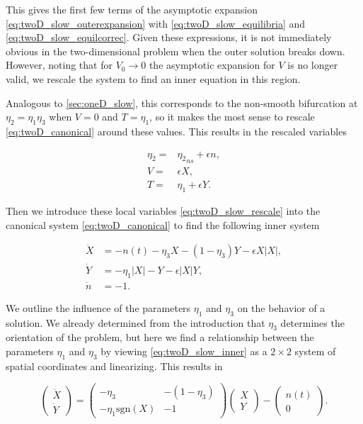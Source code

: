 This gives the first few terms of the asymptotic expansion \eqref{eq:twoD_slow_outerexpansion} with \eqref{eq:twoD_slow_equilibria} and \eqref{eq:twoD_slow_equilcorrec}. Given these expressions, it is not immediately obvious in the two-dimensional problem when the outer solution breaks down. However, noting that for $V_0\to 0$ the asymptotic expansion for $V$ is no longer valid, we rescale the system to find an inner equation in this region. 

Analogous to \autoref{sec:oneD_slow}, this corresponds to the non-smooth bifurcation at $\eta_2=\eta_1\eta_3$ when $V=0$ and $T=\eta_1$, so it makes the most sense to rescale \eqref{eq:twoD_canonical} around these values. This results in the rescaled variables

\begin{equation}\label{eq:twoD_slow_rescale}
\begin{aligned}
\eta_2=&{\eta_2}_{ns}+\epsilon n,\\
V=&\epsilon X,\\
T=&\eta_1+\epsilon Y.
\end{aligned}
\end{equation}

Then we introduce these local variables \eqref{eq:twoD_slow_rescale} into the canonical system \eqref{eq:twoD_canonical} to find the following inner system

\begin{equation}\label{eq:twoD_slow_inner}
\begin{aligned}
  \dot{X} & = -n(t)-\eta_3 X-(1-\eta_3)Y-\epsilon X|X|, \\
  \dot{Y} & = -\eta_1 |X|-Y-\epsilon |X|Y, \\
 \dot{n} & = -1.
 \end{aligned}
\end{equation}

We outline the influence of the parameters $\eta_1$ and $\eta_3$ on the behavior of a solution. We already determined from the introduction that $\eta_3$ determines the orientation of the problem, but here we find a relationship between the parameters $\eta_1$ and $\eta_3$ by viewing \eqref{eq:twoD_slow_inner} as a $2\times 2$ system of spatial coordinates and linearizing. This results in 

\begin{equation}\label{eq:twoD_slow_innermatrix}
\begin{pmatrix}
\dot{X}\\
\dot{Y}
\end{pmatrix}=
\begin{pmatrix}
-\eta_3 & -(1-\eta_3) \\ 
-\eta_1\text{sgn}(X) & -1
\end{pmatrix}
\begin{pmatrix}
X\\
Y
\end{pmatrix}-
\begin{pmatrix}
n(t)\\
0
\end{pmatrix}.
\end{equation}


